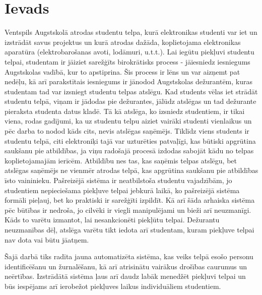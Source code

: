 \chapter*{Ievads}


Ventspils Augstskolā atrodas studentu telpa, kurā elektronikas studenti var iet un izstrādāt savus projektus un kurā atrodas dažāda, koplietojama elektronikas aparatūra (elektrobarošanas avoti, lodāmuri, u.t.t.). Lai iegūtu piekļuvi studentu telpai, studentam ir jāiziet sarežģīts birokrātisks process - jāiesniedz iesniegums Augstskolas vadībā, kur to apstiprina. Šis process ir lēns un var aizņemt pat nedēļu, kā arī parakstītais iesniegums ir jānodod Augstskolas dežurantēm, kuras studentam tad var izsniegt studentu telpas atslēgu.
Kad students vēlas iet strādāt studentu telpā, viņam ir jādodas pie dežurantes, jālūdz atslēgas un tad dežurante pieraksta studenta datus kladē. Tā kā atslēga, ko izsniedz studentiem, ir tikai viena, rodas gadījumi, ka uz studentu telpu aiziet vairāki studenti vienlaikus un pēc darba to nodod kāds cits, nevis atslēgas saņēmējs. Tiklīdz viens students ir studentu telpā, citi elektroniķi tajā var uzturēties patvaļīgi, kas būtiski apgrūtina saukšanu pie atbildības, ja viņu radošajā procesā izdodas sabojāt kādu no telpas koplietojamajām ierīcēm. Atbildību nes tas, kas saņēmis telpas atslēgu, bet atslēgas saņēmējs ne vienmēr atrodas telpā, kas apgrūtina saukšanu pie atbildības īsto vaininieku.
Pašreizējā sistēma ir neatbilstoša studentu vajadzībām, jo studentiem nepieciešama piekļuve telpai jebkurā laikā, ko pašreizējā sistēma formāli pieļauj, bet ko praktiski ir sarežģīti izpildīt. Kā arī šāda arhaiska sistēma pēc būtības ir nedroša, jo cilvēki ir viegli manipulējami un bieži arī neuzmanīgi. Kāds to varētu izmantot, lai nesankcionēti piekļūtu telpai. Dežurantu neuzmanības dēļ, atslēga varētu tikt iedota arī studentam, kuram piekļuve telpai nav dota vai būtu jāatņem.

Šajā darbā tiks radīta jauna automatizēta sistēma, kas veiks telpā esošo personu identificēšanu un žurnalēšanu, kā arī atrisinātu vairākus drošības caurumus un neērtības. Izstrādātā sistēma ļaus arī daudz labāk menedžēt piekļuvi telpai un būs iespējams arī ierobežot piekļuves laikus individuāliem studentiem.

